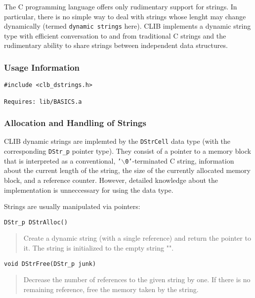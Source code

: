The C programming language offers only rudimentary support for
strings. In particular, there is no simple way to deal with strings
whose lenght may change dynamically (termed \texttt{dynamic strings}
here). CLIB implements a dynamic string type with efficient
conversation to and from traditional C strings and the rudimentary
ability to share strings between independent data structures.


\subsubsection{Usage Information}

\begin{verbatim}
#include <clb_dstrings.h>

Requires: lib/BASICS.a
\end{verbatim}


\subsubsection{Allocation and Handling of Strings}

CLIB dynamic strings are implemted by the \texttt{DStrCell} data type
(with the corresponding \texttt{DStr\_p} pointer type). They consist
of a pointer to a memory block that is interpreted as a conventional,
\texttt{'$\backslash{}$0'}-terminated C string, information about the current
length of the string, the size of the currently allocated memory
block, and a reference counter. However, detailed knowledge about the
implementation is unneccessary for using the data type.

Strings are usually manipulated via pointers:

\begin{verbatim}
DStr_p DStrAlloc()
\end{verbatim}
\begin{quote}
  Create a dynamic string (with a single reference) and return the
  pointer to it. The string is initialized to the empty string "".
\end{quote}

\begin{verbatim}
void DStrFree(DStr_p junk)
\end{verbatim}
\begin{quote}
  Decrease the number of references to the given string by one. If
  there is no remaining reference, free the memory taken by the
  string.
\end{quote}

